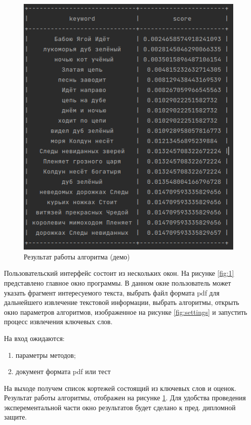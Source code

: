 \begin{figure}
	\centering
	\includegraphics[width=1\linewidth]{src/img/programm/result}
	\caption{Результат работы алгоритма (демо)}
	\label{fig:result}
\end{figure}
	
Пользовательский интерфейс состоит из нескольких окон.
На рисунке \ref{fig:1} представлено главное окно программы.
В данном окне пользователь может указать фрагмент интересуемого текста, выбрать файл формата pdf для дальнейшего извлечение текстовой информации, выбрать алгоритмы, открыть окно параметров алгоритмов, изображенное на рисунке \ref{fig:settings} и запустить процесс извлечения ключевых слов.

На вход ожидаются:
\begin{enumerate}
	\item параметры методов;
	\item документ формата pdf или тест
\end{enumerate}
На выходе получем список кортежей состоящий из ключевых слов и оценок.
Результат работы алгоритмы, отображен на рисунке \ref{fig:result}.
Для удобства проведения эксперементальной части окно результатов будет сделано к пред. дипломной защите.

